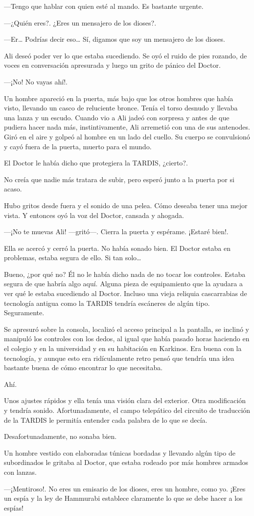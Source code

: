 ---Tengo que hablar con quien esté al mando. Es bastante urgente.

---¿Quién eres?. ¿Eres un mensajero de los dioses?.

---Er\ldots{} Podrías decir eso\ldots{} Sí, digamos que soy un mensajero
de los dioses.

Ali deseó poder ver lo que estaba sucediendo. Se oyó el ruido de pies
rozando, de voces en conversación apresurada y luego un grito de pánico
del Doctor.

---¡No! No vayas ahí!.

Un hombre apareció en la puerta, más bajo que los otros hombres que
había visto, llevando un casco de reluciente bronce. Tenía el torso
desnudo y llevaba una lanza y un escudo. Cuando vio a Ali jadeó con
sorpresa y antes de que pudiera hacer nada más, instintivamente, Ali
arremetió con una de sus antenodes. Giró en el aire y golpeó al hombre
en un lado del cuello. Su cuerpo se convulsionó y cayó fuera de la
puerta, muerto para el mundo.

El Doctor le había dicho que protegiera la TARDIS, ¿cierto?.

No creía que nadie más tratara de subir, pero esperó junto a la puerta
por si acaso.

Hubo gritos desde fuera y el sonido de una pelea. Cómo deseaba tener una
mejor vista. Y entonces oyó la voz del Doctor, cansada y ahogada.

---¡No te muevas Ali! ---gritó---. Cierra la puerta y espérame. ¡Estaré
bien!.

Ella se acercó y cerró la puerta. No había sonado bien. El Doctor estaba
en problemas, estaba segura de ello. Si tan solo\ldots{}

Bueno, ¿por qué no? Él no le había dicho nada de no tocar los controles.
Estaba segura de que habría algo aquí. Alguna pieza de equipamiento que
la ayudara a ver qué le estaba sucediendo al Doctor. Incluso una vieja
reliquia cascarrabias de tecnología antigua como la TARDIS tendría
escáneres de algún tipo. Seguramente.

Se apresuró sobre la consola, localizó el acceso principal a la
pantalla, se inclinó y manipuló los controles con los dedos, al igual
que había pasado horas haciendo en el colegio y en la universidad y en
su habitación en Karkinos. Era buena con la tecnología, y aunque esto
era ridículamente retro pensó que tendría una idea bastante buena de
cómo encontrar lo que necesitaba.

Ahí.

Unos ajustes rápidos y ella tenía una visión clara del exterior. Otra
modificación y tendría sonido. Afortunadamente, el campo telepático del
circuito de traducción de la TARDIS le permitía entender cada palabra de
lo que se decía.

Desafortunadamente, no sonaba bien.

Un hombre vestido con elaboradas túnicas bordadas y llevando algún tipo
de subordinados le gritaba al Doctor, que estaba rodeado por más hombres
armados con lanzas.

---¡Mentiroso!. No eres un emisario de los dioses, eres un hombre, como
yo. ¡Eres un espía y la ley de Hammurabi establece claramente lo que se
debe hacer a los espías!